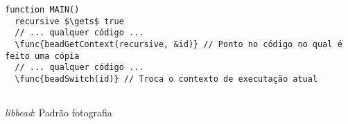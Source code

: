 \begin{pseudocode}
\begin{lstlisting}[language=pseudocode, style=pseudocode]
function MAIN()
  recursive $\gets$ true
  // ... qualquer código ...
  \func{beadGetContext(recursive, &id)} // Ponto no código no qual é feito uma cópia
  // ... qualquer código ...
  \func{beadSwitch(id)} // Troca o contexto de executação atual
  
\end{lstlisting}

  \caption{\emph{libbead}: Padrão fotografia}
  \label{alg:libBeadFotografia}
\end{pseudocode}
